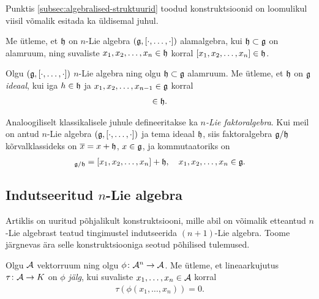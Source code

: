 Punktis \ref{subsec:algebralised-struktuurid} toodud konstruktsioonid
on loomulikul viisil võmalik esitada ka üldisemal juhul.

\begin{dfn}\label{def:n-lie-alamalgebra}
    Me ütleme, et $\mathfrak{h}$ on $n$-Lie algebra $(\mathfrak{g}, [\cdot, \dots, \cdot])$
    alamalgebra, kui $\mathfrak{h} \subset \mathfrak{g}$ on alamruum, ning suvaliste
    $x_1, x_2, \dots, x_n \in \mathfrak{h}$ korral $[x_1, x_2, \dots, x_n] \in \mathfrak{h}$.
\end{dfn}

\begin{dfn}\label{def:n-lie-algebra-ideaal}
    Olgu $(\mathfrak{g}, [\cdot, \dots, \cdot])$ $n$-Lie algebra ning olgu
    $\mathfrak{h} \subset \mathfrak{g}$ alamruum. Me ütleme, et $\mathfrak{h}$ on $\mathfrak{g}$ \emph{ideaal}, kui
    iga $h \in \mathfrak{h}$ ja $x_1, x_2, \dots, x_{n-1} \in \mathfrak{g}$ korral
    \begin{align*}
        [h, x_1, x_2, \dots, x_{n-1}] \in \h.
    \end{align*}
\end{dfn}

Analoogiliselt klassikalisele juhule defineeritakse ka
\emph{$n$-Lie faktoralgebra}.
Kui meil on antud $n$-Lie algebra $(\mathfrak{g}, [\cdot, \dots, \cdot])$ ja tema
ideaal $\mathfrak{h}$, siis faktoralgebra $\mathfrak{g}/\mathfrak{h}$ kõrvalklassideks on
$\overline{x} = x + \mathfrak{h}$, $x \in \mathfrak{g}$, ja kommutaatoriks on
\begin{align*}
    [x_1 + \h, x_2 + \h, \dots, x_n + \h]_{\g/\h} =
    [x_1, x_2, \dots, x_n] + \h,\quad
    x_1, x_2, \dots, x_n \in \g.
\end{align*}

\subsection{Indutseeritud \texorpdfstring{$n$}{n}-Lie algebra
  }\label{subsec:indutseeritud-n-lie-alg}

Artiklis \cite{AKMS:2014} on uuritud põhjalikult konstruktsiooni, mille
abil on võimalik etteantud $n$-Lie algebrast teatud tingimustel indutseerida
$(n+1)$-Lie algebra. Toome järgnevas ära selle konstruktsiooniga seotud
põhilised tulemused.

\begin{dfn}
    Olgu $\mathcal{A}$ vektorruum ning olgu $\phi \colon \mathcal{A}^n \to \mathcal{A}$. Me
    ütleme, et lineaarkujutus $\tau \colon \mathcal{A} \to K$ on
    \emph{$\phi$ jälg}, kui suvaliste $x_1, \dots, x_n \in \mathcal{A}$
    korral
    \begin{align*}
        \tau \left(
            \phi \left( x_1, \dots, x_n \right)
        \right) = 0.
    \end{align*}
\end{dfn}

